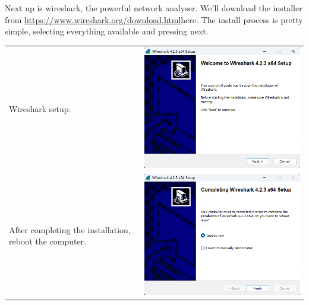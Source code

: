 \documentclass[11pt,a4paper]{report}
\begin{document}
        Next up is wireshark, the powerful network analyser.
        We'll download the installer from \url{https://www.wireshark.org/download.html}{here}.
        The install process is pretty simple, selecting everything available and pressing next.
        \begin{tabular}{ l r }
            Wireshark setup.                                        & \includegraphics[scale=0.3]{install_wireshark02} \\
            After completing the installation, reboot the computer. & \includegraphics[scale=0.3]{install_wireshark21} \\
        \end{tabular}
\end{document}
